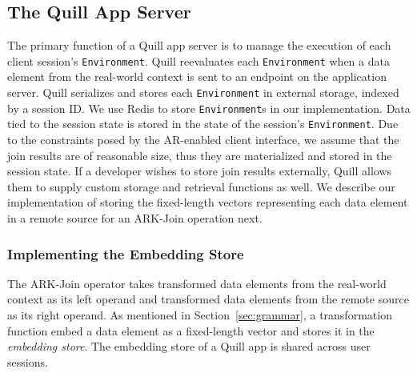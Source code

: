 \documentclass[11pt]{article}
\begin{document}
\subsection{The Quill App Server}
\label{sec:implementation:server}
The primary function of a Quill app server is to manage the execution of each client session's \texttt{Environment}.
Quill reevaluates each \texttt{Environment} when a data element from the real-world context is sent to an endpoint on the application server. Quill serializes and stores each \texttt{Environment} in external storage, indexed by a session ID. We use Redis to store \texttt{Environment}s in our implementation. Data tied to the session state is stored in the state of the session's \texttt{Environment}. Due to the constraints posed by the AR-enabled client interface, we assume that the join results are of reasonable size, thus they are materialized and stored in the session state. If a developer wishes to store join results externally, Quill allows them to supply custom storage and retrieval functions as well.
We describe our implementation of storing the fixed-length vectors representing each data element in a remote source for an ARK-Join operation next.\vspace{0.05cm}

\subsubsection{Implementing the Embedding Store}
\label{sec:implementation:server:join}
The ARK-Join operator takes transformed data elements from the {real-world context} as its left operand and transformed data elements from the remote source as its right operand.
As mentioned in Section~\ref{sec:grammar}, a transformation function embed a data element as a fixed-length vector and stores it in the \emph{embedding store}. The embedding store of a Quill app is shared across user sessions.\vspace{0.05cm}
\end{document}
